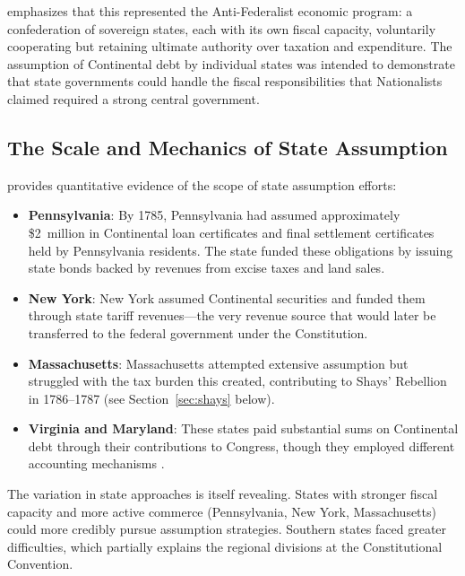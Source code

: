 \documentclass[12pt]{article}
\begin{document}
\citet[ch.~48]{Rothbard2019} emphasizes that this represented the
Anti-Federalist economic program: a confederation of sovereign states,
each with its own fiscal capacity, voluntarily cooperating but retaining
ultimate authority over taxation and expenditure. The assumption of
Continental debt by individual states was intended to demonstrate that
state governments could handle the fiscal responsibilities that
Nationalists claimed required a strong central government.

\subsection{The Scale and Mechanics of State Assumption}

\citet{Ferguson1961} provides quantitative evidence of the scope of
state assumption efforts:

\begin{itemize}
\item \textbf{Pennsylvania}: By 1785, Pennsylvania had assumed
  approximately \$2~million in Continental loan certificates and final
  settlement certificates held by Pennsylvania residents. The state
  funded these obligations by issuing state bonds backed by revenues from
  excise taxes and land sales.

\item \textbf{New York}: New York assumed Continental securities and
  funded them through state tariff revenues---the very revenue source
  that would later be transferred to the federal government under the
  Constitution.

\item \textbf{Massachusetts}: Massachusetts attempted extensive
  assumption but struggled with the tax burden this created,
  contributing to Shays' Rebellion in 1786--1787 (see
  Section~\ref{sec:shays} below).

\item \textbf{Virginia and Maryland}: These states paid substantial sums
  on Continental debt through their contributions to Congress, though
  they employed different accounting mechanisms
  \citep[pp.~248--251]{Ferguson1961}.
\end{itemize}

The variation in state approaches is itself revealing. States with
stronger fiscal capacity and more active commerce (Pennsylvania, New
York, Massachusetts) could more credibly pursue assumption strategies.
Southern states faced greater difficulties, which partially explains the
regional divisions at the Constitutional Convention.
\end{document}
